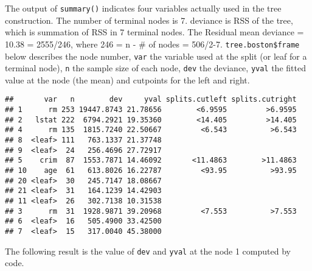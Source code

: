 \documentclass[]{book}
\newenvironment{Shaded}{\begin{snugshade}}{\end{snugshade}}
\newcommand{\DecValTok}[1]{\textcolor[rgb]{0.00,0.00,0.81}{#1}}
\newcommand{\KeywordTok}[1]{\textcolor[rgb]{0.13,0.29,0.53}{\textbf{#1}}}
\newcommand{\NormalTok}[1]{#1}
\newcommand{\OperatorTok}[1]{\textcolor[rgb]{0.81,0.36,0.00}{\textbf{#1}}}
\newcommand{\StringTok}[1]{\textcolor[rgb]{0.31,0.60,0.02}{#1}}
\begin{document}
The output of \texttt{summary()} indicates four variables actually used in the tree construction. The number of terminal nodes is 7. deviance is RSS of the tree, which is summation of RSS in 7 terminal nodes. The Residual mean deviance = 10.38 = 2555/246, where 246 = n - \# of nodes = 506/2-7. \texttt{tree.boston\$frame} below describes the node number, \texttt{var} the variable used at the split (or leaf for a terminal node), \texttt{n} the sample size of each node, \texttt{dev} the deviance, \texttt{yval} the fitted value at the node (the mean) and cutpoints for the left and right.

\begin{Shaded}
\end{Shaded}

\begin{verbatim}
##       var   n        dev     yval splits.cutleft splits.cutright
## 1      rm 253 19447.8743 21.78656        <6.9595         >6.9595
## 2   lstat 222  6794.2921 19.35360        <14.405         >14.405
## 4      rm 135  1815.7240 22.50667         <6.543          >6.543
## 8  <leaf> 111   763.1337 21.37748                               
## 9  <leaf>  24   256.4696 27.72917                               
## 5    crim  87  1553.7871 14.46092       <11.4863        >11.4863
## 10    age  61   613.8026 16.22787         <93.95          >93.95
## 20 <leaf>  30   245.7147 18.08667                               
## 21 <leaf>  31   164.1239 14.42903                               
## 11 <leaf>  26   302.7138 10.31538                               
## 3      rm  31  1928.9871 39.20968         <7.553          >7.553
## 6  <leaf>  16   505.4900 33.42500                               
## 7  <leaf>  15   317.0040 45.38000
\end{verbatim}

The following result is the value of \texttt{dev} and \texttt{yval} at the node 1 computed by code.

\begin{Shaded}
\end{Shaded}
\end{document}
